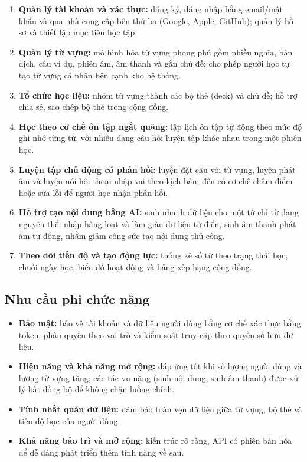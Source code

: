 \begin{enumerate}
  \item \textbf{Quản lý tài khoản và xác thực:} đăng ký, đăng nhập bằng
        email/mật khẩu và qua nhà cung cấp bên thứ ba (Google, Apple,
        GitHub); quản lý hồ sơ và thiết lập mục tiêu học tập.
  \item \textbf{Quản lý từ vựng:} mô hình hóa từ vựng phong phú gồm nhiều
        nghĩa, bản dịch, câu ví dụ, phiên âm, âm thanh và gắn chủ đề; cho
        phép người học tự tạo từ vựng cá nhân bên cạnh kho hệ thống.
  \item \textbf{Tổ chức học liệu:} nhóm từ vựng thành các bộ thẻ (deck)
        và chủ đề; hỗ trợ chia sẻ, sao chép bộ thẻ trong cộng đồng.
  \item \textbf{Học theo cơ chế ôn tập ngắt quãng:} lập lịch ôn tập tự
        động theo mức độ ghi nhớ từng từ, với nhiều dạng câu hỏi luyện tập
        khác nhau trong một phiên học.
  \item \textbf{Luyện tập chủ động có phản hồi:} luyện đặt câu với từ vựng,
        luyện phát âm và luyện nói hội thoại nhập vai theo kịch bản, đều có
        cơ chế chấm điểm hoặc sửa lỗi để người học nhận phản hồi.
  \item \textbf{Hỗ trợ tạo nội dung bằng AI:} sinh nhanh dữ liệu cho một
        từ chỉ từ dạng nguyên thể, nhập hàng loạt và làm giàu dữ liệu từ
        điển, sinh âm thanh phát âm tự động, nhằm giảm công sức tạo nội
        dung thủ công.
  \item \textbf{Theo dõi tiến độ và tạo động lực:} thống kê số từ theo
        trạng thái học, chuỗi ngày học, biểu đồ hoạt động và bảng xếp hạng
        cộng đồng.
\end{enumerate}

\subsection{Nhu cầu phi chức năng}

\begin{itemize}
  \item \textbf{Bảo mật:} bảo vệ tài khoản và dữ liệu người dùng bằng cơ
        chế xác thực bằng token, phân quyền theo vai trò và kiểm soát truy
        cập theo quyền sở hữu dữ liệu.
  \item \textbf{Hiệu năng và khả năng mở rộng:} đáp ứng tốt khi số lượng
        người dùng và lượng từ vựng tăng; các tác vụ nặng (sinh nội dung,
        sinh âm thanh) được xử lý bất đồng bộ để không chặn luồng chính.
  \item \textbf{Tính nhất quán dữ liệu:} đảm bảo toàn vẹn dữ liệu giữa từ
        vựng, bộ thẻ và tiến độ học của người dùng.
  \item \textbf{Khả năng bảo trì và mở rộng:} kiến trúc rõ ràng, API có
        phiên bản hóa để dễ dàng phát triển thêm tính năng về sau.
\end{itemize}

